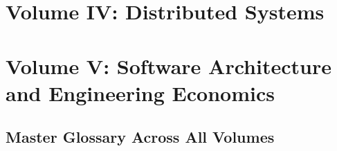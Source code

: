 \documentclass[11pt,oneside]{book}
\begin{document}
\part{Volume IV: Distributed Systems}










\part{Volume V: Software Architecture and Engineering Economics}










\backmatter

\chapter*{Master Glossary Across All Volumes}
\end{document}
